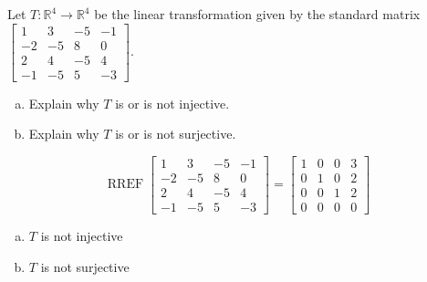 
\begin{exerciseStatement}
 Let \(T:\mathbb{R}^ 4  \to \mathbb{R}^ 4 \) be the linear transformation given by the standard matrix \( \left[\begin{array}{cccc}
1 & 3 & -5 & -1 \\
-2 & -5 & 8 & 0 \\
2 & 4 & -5 & 4 \\
-1 & -5 & 5 & -3
\end{array}\right] .\)
\begin{enumerate}[(a)]
\item Explain why \(T\) is or is not injective.
\item Explain why \(T\) is or is not surjective.
\end{enumerate}
    
\end{exerciseStatement}
    
\begin{exerciseAnswer} 


\[\operatorname{RREF} \left[\begin{array}{cccc}
1 & 3 & -5 & -1 \\
-2 & -5 & 8 & 0 \\
2 & 4 & -5 & 4 \\
-1 & -5 & 5 & -3
\end{array}\right] = \left[\begin{array}{cccc}
1 & 0 & 0 & 3 \\
0 & 1 & 0 & 2 \\
0 & 0 & 1 & 2 \\
0 & 0 & 0 & 0
\end{array}\right] \]


\begin{enumerate}[(a)]
\item \(T\) is not injective
\item \(T\) is not surjective
\end{enumerate}
    
\end{exerciseAnswer}
    
